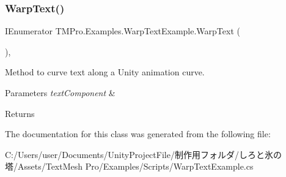 \subsubsection{\texorpdfstring{Warp\+Text()}{WarpText()}}
{\footnotesize\ttfamily I\+Enumerator T\+M\+Pro.\+Examples.\+Warp\+Text\+Example.\+Warp\+Text (\begin{DoxyParamCaption}{ }\end{DoxyParamCaption})\hspace{0.3cm}{\ttfamily [inline]}, {\ttfamily [private]}}



Method to curve text along a Unity animation curve. 


\begin{DoxyParams}{Parameters}
{\em text\+Component} & \\
\hline
\end{DoxyParams}
\begin{DoxyReturn}{Returns}

\end{DoxyReturn}


The documentation for this class was generated from the following file\+:\begin{DoxyCompactItemize}
\item 
C\+:/\+Users/user/\+Documents/\+Unity\+Project\+File/制作用フォルダ/しろと氷の塔/\+Assets/\+Text\+Mesh Pro/\+Examples/\+Scripts/Warp\+Text\+Example.\+cs\end{DoxyCompactItemize}
